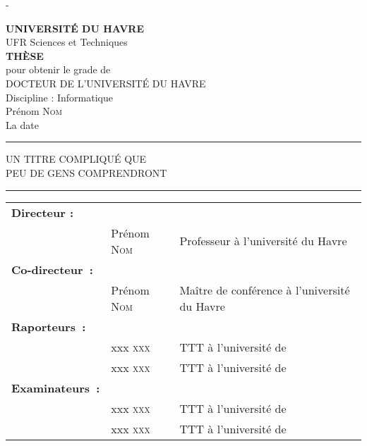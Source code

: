 \begin{titlingpage}
\begin{changemargin}{-1.4cm}{0cm}
\calccentering{\unitlength}
\begin{adjustwidth*}{\unitlength}{-\unitlength}

   {\Large
\begin{center}
   {\huge\textbf{UNIVERSIT\'E DU HAVRE} \\[0.5cm]
   UFR Sciences et Techniques}\\[0.5cm]
   \vfill
   {\LARGE\textbf{TH\`ESE}}\\[0.3cm]
   pour obtenir le grade de\\[0.3cm]
   {\LARGE DOCTEUR DE L'UNIVERSIT\'E DU HAVRE}\\[0.3cm]
   Discipline : Informatique \\
   \vfill
   Prénom \textsc{Nom} \\[0.3cm]
   La date \\
   \vfill
   \hrule 
   \vspace{0.5cm}
   {\LARGE UN TITRE COMPLIQUÉ QUE\\
	PEU DE GENS COMPRENDRONT}
   \vspace{0.5cm}
   \hrule 
   \vfill
\end{center}
}
{
\vfill
\noindent \begin{tabular}{llp{6.6cm}}
\textbf{Directeur :} & & \\
& Prénom \textsc{Nom}& Professeur à l'université du Havre\\
\textbf{Co-directeur~:} & & \\
& Prénom \textsc{Nom} & Maître de conférence à l'université du Havre \\
\textbf{Raporteurs~:}&  &\\
& xxx \textsc{xxx}& TTT à l'université de \\
& xxx \textsc{xxx}& TTT à l'université de  \\
\textbf{Examinateurs~:} & & \\
&  xxx \textsc{xxx}& TTT à l'université de  \\
&  xxx \textsc{xxx}& TTT à l'université de \\
\end{tabular}
}
\end{adjustwidth*}
\end{changemargin}
\end{titlingpage}
